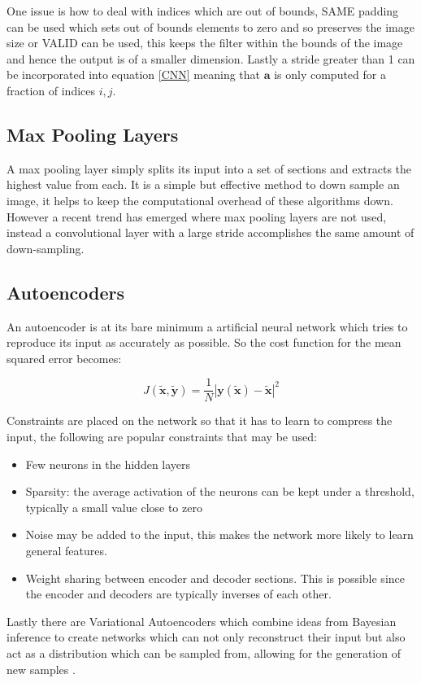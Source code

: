     One issue is how to deal with indices which are out of bounds, SAME padding can be used which sets out of bounds
    elements to zero and so preserves the image size or VALID can be used, this keeps the filter within the bounds of the
    image and hence the output is of a smaller dimension. Lastly a stride greater than 1 can be incorporated into equation
    \ref{CNN} meaning that $\mathbf{a}$ is only computed for a fraction of indices $i,j$.
  \subsection{Max Pooling Layers}
    A max pooling layer simply splits its input into a set of sections and extracts
    the highest value from each. It is a simple but effective method to down sample
    an image, it helps to keep the computational overhead of these algorithms
    down. However a recent trend \cite{Springenberg2015} has emerged where max pooling
    layers are not used, instead a convolutional layer with a large stride accomplishes
    the same amount of down-sampling.
  \subsection{Autoencoders} \label{sec:autoencoders}
    An autoencoder is at its bare minimum a artificial neural network which tries
    to reproduce its input as accurately as possible. So the cost function for the mean squared error becomes:

    \begin{equation} \label{eq:autoencoder_cost}
      J(\tilde{\mathbf{x}},\tilde{\mathbf{y}}) = \frac{1}{N}\left |\mathbf{y}(\tilde{\mathbf{x}})-\tilde{\mathbf{x}}\right | ^2
    \end{equation}

    Constraints are
    placed on the network so that it has to learn to compress the input, the following
    are popular constraints that may be used:
    \begin{itemize}
      \item Few neurons in the hidden layers
      \item Sparsity: the average activation of the neurons can be kept under a
      threshold, typically a small value close to zero \cite{autong}
      \item Noise may be added to the input, this makes the network more likely
      to learn general features.
      \item Weight sharing between encoder and decoder sections. This is possible since
            the encoder and decoders are typically inverses of each other.
    \end{itemize}
    Lastly there are Variational Autoencoders which combine ideas from Bayesian inference
    to create networks which can not only reconstruct their input but also act as a
    distribution which can be sampled from, allowing for the generation of new samples \cite{Kingma2013}.

